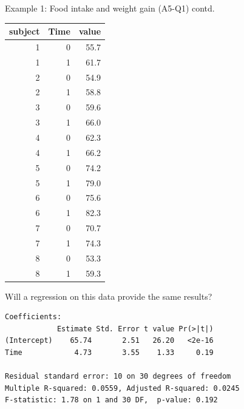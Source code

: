 \documentclass[handout]{beamer}\usepackage[]{graphicx}\usepackage[]{color}
\newenvironment{knitrout}{}{} %
\begin{document}
\begin{frame}[fragile]{Example 1: Food intake and weight gain (A5-Q1) contd.}

\begin{minipage}{0.47\textwidth}




\begin{knitrout}\scriptsize
{}\color{fgcolor}
\begin{tabular}{r|r|r}
\hline
subject & Time & value\\
\hline
1 & 0 & 55.7\\
\hline
1 & 1 & 61.7\\
\hline
2 & 0 & 54.9\\
\hline
2 & 1 & 58.8\\
\hline
3 & 0 & 59.6\\
\hline
3 & 1 & 66.0\\
\hline
4 & 0 & 62.3\\
\hline
4 & 1 & 66.2\\
\hline
5 & 0 & 74.2\\
\hline
5 & 1 & 79.0\\
\hline
6 & 0 & 75.6\\
\hline
6 & 1 & 82.3\\
\hline
7 & 0 & 70.7\\
\hline
7 & 1 & 74.3\\
\hline
8 & 0 & 53.3\\
\hline
8 & 1 & 59.3\\
\hline
\end{tabular}


\end{knitrout}

\vspace*{1cm}

\small
Will a regression on this data provide the same results?

	
\end{minipage}
\begin{minipage}{0.5\textwidth}
	\pause 
	
\begin{knitrout}\tiny
{}\color{fgcolor}
\begin{verbatim}
Coefficients:
            Estimate Std. Error t value Pr(>|t|)
(Intercept)    65.74       2.51   26.20   <2e-16
Time            4.73       3.55    1.33     0.19

Residual standard error: 10 on 30 degrees of freedom
Multiple R-squared: 0.0559,	Adjusted R-squared: 0.0245 
F-statistic: 1.78 on 1 and 30 DF,  p-value: 0.192 
\end{verbatim}


\end{knitrout}
\end{minipage}
\end{frame}
\end{document}
